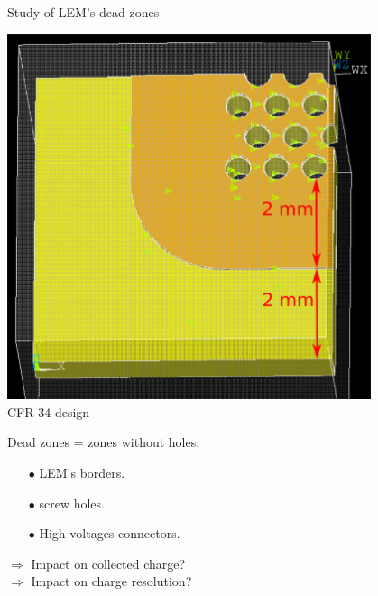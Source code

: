 \documentclass[10pt]{beamer}
\begin{document}
    \begin{frame}{Study of LEM's dead zones}
    	\begin{scriptsize}
    		\begin{minipage}{0.38\textwidth}
    			\begin{center}
    				\includegraphics[width=0.8\textwidth]{figures/666/corner_annotations.png}\\
    				CFR-34 design\\
    			\end{center} 
    			Dead zones = zones without holes:
    			\begin{itemize}
    				\item[$\bullet$] LEM's borders.
    				\item[$\bullet$] screw holes.
    				\item[$\bullet$] High voltages connectors.
    			\end{itemize}
    			$\Rightarrow$ Impact on collected charge?\\
    			$\Rightarrow$ Impact on charge resolution?\\
    			

\end{minipage}
\end{scriptsize}
\end{frame}
\end{document}
